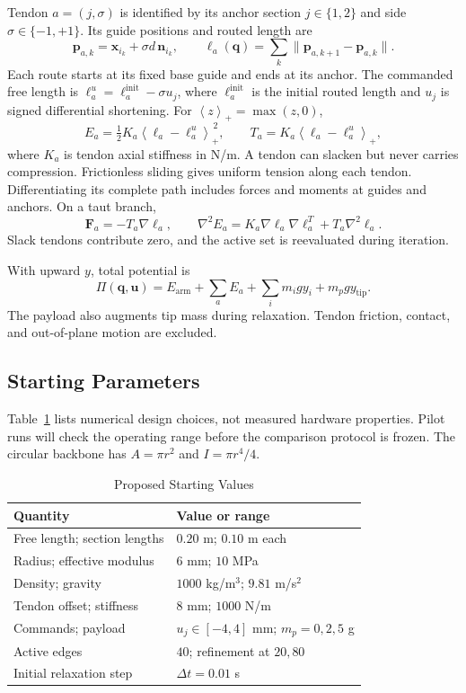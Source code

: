\documentclass[letterpaper,10pt,conference]{ieeeconf}
\newcommand{\vct}[1]{\boldsymbol{#1}}
\newcommand{\pos}[1]{\left\langle #1\right\rangle_{+}}
\begin{document}
Tendon $a=(j,\sigma)$ is identified by its anchor section
$j\in\{1,2\}$ and side $\sigma\in\{-1,+1\}$. Its guide positions
and routed length are
\begin{equation}
\vct{p}_{a,k}=\vct{x}_{i_k}+\sigma d\,\vct{n}_{i_k},
\qquad
\ell_a(\vct{q})=\sum_k\|\vct{p}_{a,k+1}-\vct{p}_{a,k}\|.
\label{eq:routing}
\end{equation}
Each route starts at its fixed base guide and ends at its anchor.
The commanded free length is
$\ell_a^u=\ell_a^{\mathrm{init}}-\sigma u_j$,
where $\ell_a^{\mathrm{init}}$ is the initial routed length and $u_j$
is signed differential shortening. For $\pos{z}=\max(z,0)$,
\begin{equation}
E_a=\tfrac12K_a\pos{\ell_a-\ell_a^u}^{\,2},
\qquad T_a=K_a\pos{\ell_a-\ell_a^u},
\label{eq:tendon}
\end{equation}
where $K_a$ is tendon axial stiffness in N/m. A tendon can slacken
but never carries compression. Frictionless sliding gives uniform
tension along each tendon. Differentiating its complete path includes
forces and moments at guides and anchors. On a taut branch,
\begin{equation}
\vct{F}_a=-T_a\nabla\ell_a,\qquad
\nabla^2 E_a=K_a\nabla\ell_a\nabla\ell_a^T+T_a\nabla^2\ell_a .
\end{equation}
Slack tendons contribute zero, and the active set is reevaluated
during iteration.

With upward $y$, total potential is
\begin{equation}
\Pi(\vct{q},\vct{u})=E_{\mathrm{arm}}+\sum_a E_a+
\sum_i m_i g y_i+m_p g y_{\mathrm{tip}}.
\end{equation}
The payload also augments tip mass during relaxation. Tendon friction,
contact, and out-of-plane motion are excluded.

\subsection{Starting Parameters}
Table~\ref{tab:parameters} lists numerical design choices, not measured
hardware properties. Pilot runs will check the operating range before
the comparison protocol is frozen. The circular backbone has
$A=\pi r^2$ and $I=\pi r^4/4$.
\begin{table}[t]
\caption{Proposed Starting Values}
\label{tab:parameters}
\centering
\begin{tabular}{@{}ll@{}}
\toprule
Quantity & Value or range\\
\midrule
Free length; section lengths & $0.20$ m; $0.10$ m each\\
Radius; effective modulus & $6$ mm; $10$ MPa\\
Density; gravity & $1000$ kg/m$^3$; $9.81$ m/s$^2$\\
Tendon offset; stiffness & $8$ mm; $1000$ N/m\\
Commands; payload & $u_j\in[-4,4]$ mm; $m_p=0,2,5$ g\\
Active edges & $40$; refinement at $20,80$\\
Initial relaxation step & $\Delta t=0.01$ s\\
\bottomrule
\end{tabular}
\end{table}
\end{document}
